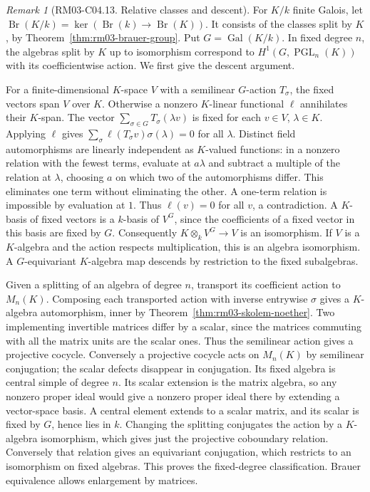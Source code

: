 \documentclass[11pt,oneside,openany]{book}
\theoremstyle{definition}
\theoremstyle{remark}
\newtheorem{remark}[theorem]{Remark}
\begin{document}
\begin{remark}[RM03-C04.13. Relative classes and descent]
\label{rem:rm03-relative-brauer}
For \(K/k\) finite Galois, let
\(\operatorname{Br}(K/k)=\ker(\operatorname{Br}(k)\to\operatorname{Br}(K))\).
It consists of the classes split by \(K\), by
Theorem~\ref{thm:rm03-brauer-group}. Put \(G=\operatorname{Gal}(K/k)\).
In fixed degree \(n\), the algebras split by \(K\) up to
isomorphism correspond to \(H^1(G,\operatorname{PGL}_n(K))\)
with its coefficientwise action. We first give the descent argument.

For a finite-dimensional \(K\)-space \(V\) with a semilinear
\(G\)-action \(T_\sigma\), the fixed vectors span \(V\) over \(K\).
Otherwise a nonzero \(K\)-linear functional \(\ell\) annihilates
their \(K\)-span. The vector
\(\sum_{\sigma\in G} T_\sigma(\lambda v)\) is fixed for each
\(v\in V\), \(\lambda\in K\). Applying \(\ell\) gives
\(\sum_\sigma\ell(T_\sigma v)\sigma(\lambda)=0\) for all \(\lambda\).
Distinct field automorphisms are linearly independent as
\(K\)-valued functions: in a nonzero relation with the fewest
terms, evaluate at \(a\lambda\) and subtract a multiple of the
relation at \(\lambda\), choosing \(a\) on which two of the
automorphisms differ. This eliminates one term without
eliminating the other. A one-term relation is impossible by
evaluation at \(1\). Thus \(\ell(v)=0\) for all \(v\), a
contradiction. A \(K\)-basis of fixed vectors is a \(k\)-basis of
\(V^G\), since the coefficients of a fixed vector in this basis
are fixed by \(G\). Consequently \(K\otimes_k V^G\to V\) is an
isomorphism. If \(V\) is a \(K\)-algebra and the action respects
multiplication, this is an algebra isomorphism. A \(G\)-equivariant
\(K\)-algebra map descends by restriction to the fixed subalgebras.

Given a splitting of an algebra of degree \(n\), transport its
coefficient action to \(M_n(K)\). Composing each transported
action with inverse entrywise \(\sigma\) gives a \(K\)-algebra
automorphism, inner by Theorem~\ref{thm:rm03-skolem-noether}.
Two implementing invertible matrices differ by a scalar, since
the matrices commuting with all the matrix units are the scalar
ones. Thus the semilinear action gives a projective cocycle.
Conversely a projective cocycle acts on \(M_n(K)\) by semilinear
conjugation; the scalar defects disappear in conjugation. Its
fixed algebra is central simple of degree \(n\). Its scalar
extension is the matrix algebra, so any nonzero proper ideal
would give a nonzero proper ideal there by extending a vector-space
basis. A central element extends to a scalar matrix, and its
scalar is fixed by \(G\), hence lies in \(k\). Changing the
splitting conjugates the action by a \(K\)-algebra isomorphism,
which gives just the projective coboundary relation.
Conversely that relation gives an equivariant conjugation, which
restricts to an isomorphism on fixed algebras. This proves the
fixed-degree classification. Brauer equivalence allows
enlargement by matrices.


\end{remark}
\end{document}
